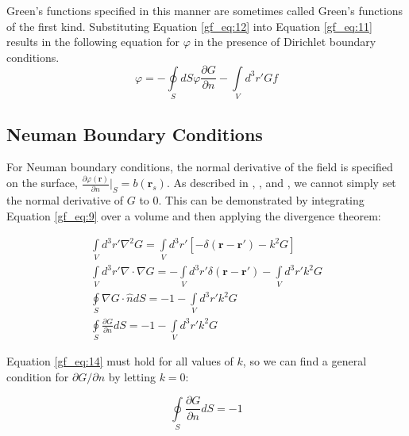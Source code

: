 Green's functions specified in this manner are sometimes called Green's functions of the first kind. Substituting Equation \ref{gf_eq:12} into Equation \ref{gf_eq:11} results in the following equation for $\varphi$ in the presence of Dirichlet boundary conditions.
\begin{equation}
\boxed{\varphi = -\oint\limits_{S}dS \varphi\frac{\partial G}{\partial n} -\int\limits_{V}d^3r' Gf}
\label{gf_eq:13}
\end{equation}
\renewcommand{\baselinestretch}{2} \small\normalsize

\subsection {Neuman Boundary Conditions}
For Neuman boundary conditions, the normal derivative of the field is specified on the surface, $\frac{\partial\varphi\left(\mathbf{r}\right)}{\partial n}|_{S} = b\left(\mathbf{r}_s\right)$. As described in \cite{jackson_classical_em}, \cite{zangwill_modern_em}, and \cite{balanis_advanced}, we cannot simply set the normal derivative of $G$ to $0$. This can be demonstrated by integrating Equation \ref{gf_eq:9} over a volume and then applying the divergence theorem:

\begin{equation}
\begin{gathered}
\int\limits_{V}d^3r' \nabla^2 G = \int\limits_{V}d^3r'\left[-\delta\left(\mathbf{r}-\mathbf{r}' \right) -k^2G \right] \\
\int\limits_{V}d^3r' \nabla \cdot \nabla G = -\int\limits_{V}d^3r'\delta\left(\mathbf{r}-\mathbf{r}' \right) -\int\limits_{V}d^3r'k^2G \\
\oint\limits_{S}\nabla G \cdot \hat{n} dS  = -1 - \int\limits_{V}d^3r'k^2G\\
\oint\limits_{S}\frac{\partial G}{\partial n} dS = -1 - \int\limits_{V}d^3r' k^2G
\end{gathered}
\label{gf_eq:14}
\end{equation}
\renewcommand{\baselinestretch}{2} \small\normalsize

Equation \ref{gf_eq:14} must hold for all values of $k$, so we can find a general condition for $\partial G/\partial n$ by letting $k = 0$:

\begin{equation}
\oint\limits_{S}\frac{\partial G}{\partial n} dS = -1
\label{gf_eq:15}
\end{equation}
\renewcommand{\baselinestretch}{2} \small\normalsize

